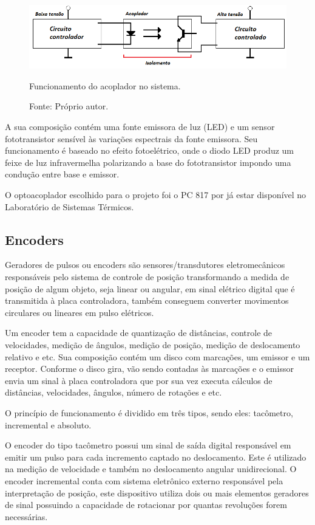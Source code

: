 \begin{figure}[H]
\centering
\includegraphics[width = 1\linewidth]{figuras/acoplador}
\caption{Funcionamento do acoplador no sistema.}
\caption*{Fonte: Próprio autor.}
\label{fig:acoplador}
\end{figure}
    
A sua composição contém uma fonte emissora de luz (LED) e um sensor fototransistor sensível às variações 
espectrais da fonte emissora. Seu funcionamento é baseado no efeito fotoelétrico, onde o diodo LED produz 
um feixe de luz infravermelha polarizando a base do fototransistor impondo uma condução entre base e emissor.

O optoacoplador escolhido para o projeto foi o PC 817 por já estar disponível no Laboratório de Sistemas 
Térmicos.

\subsection{Encoders}\label{subsec:metencoder}

Geradores de pulsos ou encoders são sensores/transdutores eletromecânicos responsáveis pelo sistema de 
controle de posição transformando a medida de posição de algum objeto, seja linear ou angular, em sinal 
elétrico digital que é transmitida à placa controladora, também conseguem converter movimentos circulares 
ou lineares em pulso elétricos.

Um encoder tem a capacidade de quantização de distâncias, controle de velocidades, medição de ângulos, 
medição de posição, medição de deslocamento relativo e etc. Sua composição contém um disco com marcações, 
um emissor e um receptor. Conforme o disco gira, vão sendo contadas às marcações e o emissor envia um sinal 
à placa controladora que por sua vez executa cálculos de distâncias, velocidades, ângulos, número de rotações 
e etc.

O princípio de funcionamento é dividido em três tipos, sendo eles: tacômetro, incremental e absoluto.

O encoder do tipo tacômetro possui um sinal de saída digital responsável em emitir um pulso para cada 
incremento captado no deslocamento. Este é utilizado na medição de velocidade e também no deslocamento 
angular unidirecional. O encoder incremental conta com sistema eletrônico externo responsável pela 
interpretação de posição, este dispositivo utiliza dois ou mais elementos geradores de sinal possuindo 
a capacidade de rotacionar por quantas revoluções forem necessárias.

